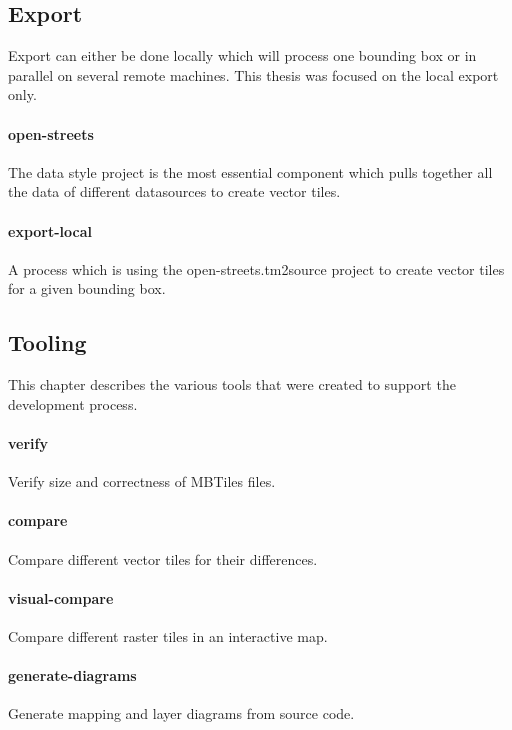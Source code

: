 \newpage
\subsection{Export}
Export can either be done locally which will process one bounding box or in parallel on several
remote machines. This thesis was focused on the local export only.

\paragraph{open-streets}
The data style project is the most essential component which pulls together all the
data of different datasources to create vector tiles. 

\paragraph{export-local}
A process which is using the open-streets.tm2source project to create vector tiles for a given bounding box.

\subsection{Tooling}

This chapter describes the various tools that were created to support the development process.

\paragraph{verify}
Verify size and correctness of MBTiles files.

\paragraph{compare}
Compare different vector tiles for their differences.

\paragraph{visual-compare}
Compare different raster tiles in an interactive map.

\paragraph{generate-diagrams}
Generate mapping and layer diagrams from source code.

